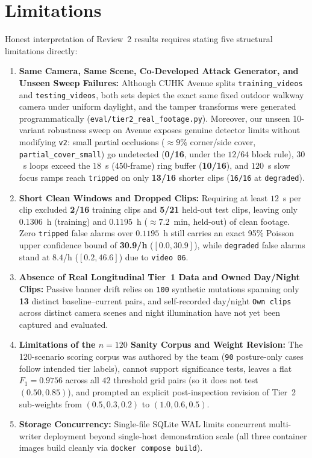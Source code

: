 \section{Limitations}
Honest interpretation of Review~2 results requires stating five structural limitations directly:
\begin{enumerate}
  \item \textbf{Same Camera, Same Scene, Co-Developed Attack Generator, and Unseen Sweep Failures:} Although CUHK Avenue splits \texttt{training\_videos} and \texttt{testing\_videos}, both sets depict the exact same fixed outdoor walkway camera under uniform daylight, and the tamper transforms were generated programmatically (\texttt{eval/tier2\_real\_footage.py}). Moreover, our unseen 10-variant robustness sweep on Avenue exposes genuine detector limits without modifying \texttt{v2}: small partial occlusions ($\approx 9\%$ corner/side cover, \texttt{partial\_cover\_small}) go undetected (\textbf{0/16}, under the $12/64$ block rule), $30$~s loops exceed the $18$~s ($450$-frame) ring buffer (\textbf{10/16}), and $120$~s slow focus ramps reach \texttt{tripped} on only \textbf{13/16} shorter clips (\texttt{16/16} at \texttt{degraded}).
  \item \textbf{Short Clean Windows and Dropped Clips:} Requiring at least $12$~s per clip excluded \textbf{2/16} training clips and \textbf{5/21} held-out test clips, leaving only $0.1306$~h (training) and $0.1195$~h ($\approx 7.2$~min, held-out) of clean footage. Zero \texttt{tripped} false alarms over $0.1195$~h still carries an exact 95\% Poisson upper confidence bound of \textbf{30.9/h} ($[0.0, 30.9]$), while \texttt{degraded} false alarms stand at $8.4$/h ($[0.2, 46.6]$) due to \texttt{video~06}.
  \item \textbf{Absence of Real Longitudinal Tier~1 Data and Owned Day/Night Clips:} Passive banner drift relies on \texttt{100} synthetic mutations spanning only \textbf{13} distinct baseline--current pairs, and self-recorded day/night \texttt{Own clips} across distinct camera scenes and night illumination have not yet been captured and evaluated.
  \item \textbf{Limitations of the $n=120$ Sanity Corpus and Weight Revision:} The 120-scenario scoring corpus was authored by the team (\texttt{90} posture-only cases follow intended tier labels), cannot support significance tests, leaves a flat $F_1 = 0.9756$ across all $42$ threshold grid pairs (so it does not test $(0.50, 0.85)$), and prompted an explicit post-inspection revision of Tier~2 sub-weights from $(0.5, 0.3, 0.2)$ to $(1.0, 0.6, 0.5)$.
  \item \textbf{Storage Concurrency:} Single-file SQLite WAL limits concurrent multi-writer deployment beyond single-host demonstration scale (all three container images build cleanly via \texttt{docker compose build}).
\end{enumerate}

